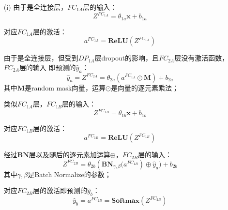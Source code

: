 \begin{solution}
    \begin{enumerate}
        \item[(i)] 
        由于是全连接层，$FC_{1A}$层的输入：$$Z^{FC_{1A}}=\theta_{1a}\bm{x}+b_{1a}$$

        对应$FC_{1A}$层的激活：$$a^{FC_{1A}}=\textbf{ReLU}(Z^{FC_{1A}})$$


        由于是全连接层，但受到$DP_{1A}$层dropout的影响，且$FC_{2A}$层没有激活函数，$FC_{2A}$层的输入
        即预测的$\hat{y}_a$：
        $$\hat{y}_a=Z^{FC_{2A}}=\theta_{2a}\left(a^{FC_{1A}}\odot\textbf{M}\right)+b_{2a}$$
        其中$\textbf{M}$是random mask向量，运算$\odot$是向量的逐元素乘法；

        类似$FC_{1A}$层，$FC_{1B}$层的输入：$$Z^{FC_{1B}}=\theta_{1b}\bm{x}+b_{1b}$$

        对应$FC_{1B}$层的激活：$$a^{FC_{1B}}=\textbf{ReLU}(Z^{FC_{1B}})$$

        经过$\textbf{BN}$层以及随后的逐元素加运算$\oplus$，$FC_{2B}$层的输入：
        $$Z^{FC_{2B}}=\theta_{2b}\left(\textbf{BN}_{\gamma,\beta}(a^{FC_{1B}}\right)\oplus\hat{y}_a)+b_{2b}$$
        其中$\gamma,\beta$是Batch Normalize的参数；

        对应$FC_{2B}$层的激活即预测的$\hat{y}_b$：$$\hat{y}_b=a^{FC_{2B}}=\textbf{Softmax}(Z^{FC_{2B}})$$
        








\end{enumerate}
\end{solution}

